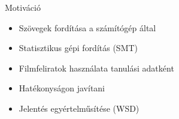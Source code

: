 \begin{frame}{Motiváció}
\begin{itemize}
  \item {Szövegek fordítása a számítógép által}
  \item {Statisztikus gépi fordítás (SMT)}
  \item {Filmfeliratok használata tanulási adatként}
  \item {Hatékonyságon javítani}
  \item {Jelentés egyértelműsítése (WSD)}
  
\end{itemize}

\end{frame}